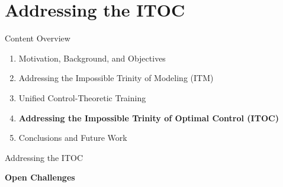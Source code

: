 \section{Addressing the ITOC}

\begin{frame}{Content Overview}
    \footnotesize
    \begin{enumerate}
        \item \textcolor{gray!50}{Motivation, Background, and Objectives}
        \item \textcolor{gray!50}{Addressing the Impossible Trinity of Modeling (ITM)}
        \item \textcolor{gray!50}{Unified Control-Theoretic Training}
        \item \colorbox{yellow!70}{\textbf{Addressing the Impossible Trinity of Optimal Control (ITOC)}}
        \item \textcolor{gray!50}{Conclusions and Future Work}
    \end{enumerate}
\end{frame}

\begin{frame}{Addressing the ITOC}
    \begin{center}
        \huge \textbf{Open Challenges}
    \end{center}
\end{frame}

